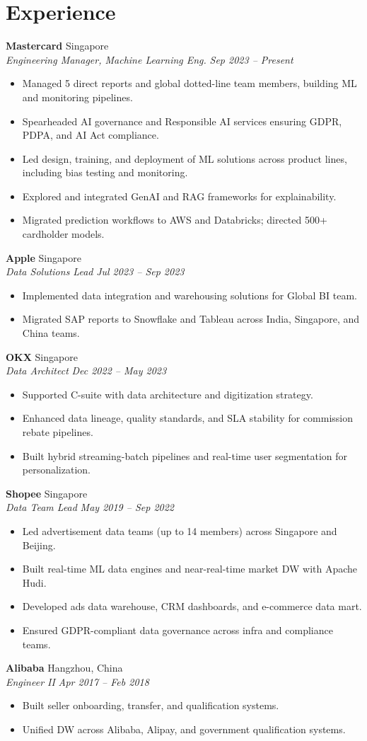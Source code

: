\documentclass[a4paper,11pt]{article}
\newcommand{\resumeItem}[1]{\item #1}
\newcommand{\resumeSubheading}[4]{
  \vspace{1pt}\textbf{#1} \hfill #2 \\
  \textit{#3} \hfill \textit{#4}\vspace{2pt}
}
\newcommand{\resumeItemListStart}{\begin{itemize}[leftmargin=*]}
\newcommand{\resumeItemListEnd}{\end{itemize}}
\begin{document}
\section*{Experience}

\resumeSubheading{Mastercard}{Singapore}{Engineering Manager, Machine Learning Eng.}{Sep 2023 -- Present}
\resumeItemListStart
  \resumeItem{Managed 5 direct reports and global dotted-line team members, building ML and monitoring pipelines.}
  \resumeItem{Spearheaded AI governance and Responsible AI services ensuring GDPR, PDPA, and AI Act compliance.}
  \resumeItem{Led design, training, and deployment of ML solutions across product lines, including bias testing and monitoring.}
  \resumeItem{Explored and integrated GenAI and RAG frameworks for explainability.}
  \resumeItem{Migrated prediction workflows to AWS and Databricks; directed 500+ cardholder models.}
\resumeItemListEnd

\resumeSubheading{Apple}{Singapore}{Data Solutions Lead}{Jul 2023 -- Sep 2023}
\resumeItemListStart
  \resumeItem{Implemented data integration and warehousing solutions for Global BI team.}
  \resumeItem{Migrated SAP reports to Snowflake and Tableau across India, Singapore, and China teams.}
\resumeItemListEnd

\resumeSubheading{OKX}{Singapore}{Data Architect}{Dec 2022 -- May 2023}
\resumeItemListStart
  \resumeItem{Supported C-suite with data architecture and digitization strategy.}
  \resumeItem{Enhanced data lineage, quality standards, and SLA stability for commission rebate pipelines.}
  \resumeItem{Built hybrid streaming-batch pipelines and real-time user segmentation for personalization.}
\resumeItemListEnd

\resumeSubheading{Shopee}{Singapore}{Data Team Lead}{May 2019 -- Sep 2022}
\resumeItemListStart
  \resumeItem{Led advertisement data teams (up to 14 members) across Singapore and Beijing.}
  \resumeItem{Built real-time ML data engines and near-real-time market DW with Apache Hudi.}
  \resumeItem{Developed ads data warehouse, CRM dashboards, and e-commerce data mart.}
  \resumeItem{Ensured GDPR-compliant data governance across infra and compliance teams.}
\resumeItemListEnd

\resumeSubheading{Alibaba}{Hangzhou, China}{Engineer II}{Apr 2017 -- Feb 2018}
\resumeItemListStart
  \resumeItem{Built seller onboarding, transfer, and qualification systems.}
  \resumeItem{Unified DW across Alibaba, Alipay, and government qualification systems.}
\resumeItemListEnd
\end{document}
